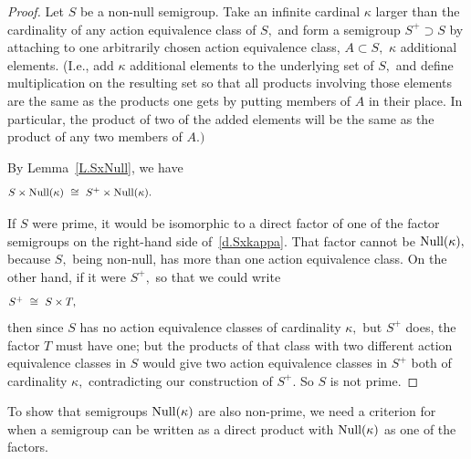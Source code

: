\documentclass{amsart}
\numberwithin{equation}{section}
\numberwithin{theorem}{section}
\begin{document}
\begin{proof}
Let $S$ be a non-null semigroup.
Take an infinite cardinal $\kappa$ larger than the
cardinality of any action equivalence class of $S,$
and form a semigroup $S^+\supset S$ by attaching to one
arbitrarily chosen
action equivalence class, $A\subset S,$ $\kappa$ additional elements.
(I.e., add $\kappa$ additional elements to the underlying set of $S,$
and define multiplication on the resulting set so that all products
involving those elements are the same as the products one
gets by putting members of $A$ in their place.
In particular, the product of two of the added elements will
be the same as the product of any two members of $A.)$

By Lemma~\ref{L.SxNull}, we have
%
\begin{equation}\begin{minipage}[c]{35pc}\label{d.Sxkappa}
$S\times\textup{Null}(\kappa)~\cong~S^+\times\textup{Null}(\kappa).$
\end{minipage}\end{equation}

If $S$ were prime, it would be isomorphic to a direct factor of one
of the factor semigroups on the right-hand side of~\eqref{d.Sxkappa}.
That factor cannot be $\textup{Null}(\kappa),$ because $S,$
being non-null, has more than one action equivalence class.
On the other hand, if it were $S^+,$ so that we could write
%
\begin{equation}\begin{minipage}[c]{35pc}\label{d.S^+=}
$S^+~\cong~S\times T,$
\end{minipage}\end{equation}
%
then since $S$ has no action equivalence classes of cardinality
$\kappa,$ but $S^+$ does, the factor $T$ must have one; but the
products of that class with two different action
equivalence classes in $S$ would give two
action equivalence classes in $S^+$ both of cardinality $\kappa,$
contradicting our construction of $S^+.$
So $S$ is not prime.
\end{proof}

To show that semigroups $\textup{Null}(\kappa)$
are also non-prime, we need
a criterion for when a semigroup can be written
as a direct product with $\textup{Null}(\kappa)$ as one of the factors.
\end{document}
